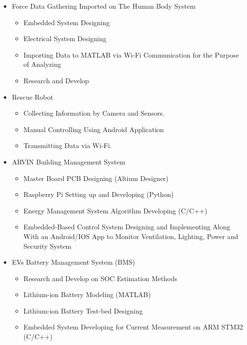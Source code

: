 \documentclass[10pt,a4paper,sans]{moderncv} %
\begin{document}
	\begin{itemize}[nosep]
		
		\item Force Data Gathering Imported on The Human Body System %
		\begin{itemize}[nosep]
			\item Embedded System Designing
			\item Electrical System Designing
			\item Importing Data to MATLAB via Wi-Fi Communication for the Purpose of Analyzing
			\item Research and Develop
		\end{itemize}
		
		\vspace{0.5em}
		
		\item Rescue Robot %
		\begin{itemize}[nosep]
		    \item Collecting Information by Camera and Sensors.
			\item Manual Controlling Using Android Application
			\item Transmitting Data via Wi-Fi. 
		\end{itemize}
		
		\vspace{0.5em}
		
		\item ARVIN Building Management System %
		\begin{itemize}[nosep]
			\item Master Board PCB Designing (Altium Designer)
			\item Raspberry Pi Setting up and Developing (Python)
			\item Energy Management System Algorithm Developing (C/C++) 
			\item Embedded-Based Control System Designing and Implementing Along With an Android/IOS App to Monitor Ventilation, Lighting, Power and Security System
		\end{itemize}
		
		\vspace{0.5em}
		
		\item EVs Battery Management System (BMS) %
		\begin{itemize}[nosep]
			\item Research and Develop on SOC Estimation Methods 
			\item Lithium-ion Battery Modeling (MATLAB)
			\item Lithium-ion Battery Test-bed Designing
			\item Embedded System Developing for Current Measurement on ARM STM32 (C/C++)
		\end{itemize}
		

\end{itemize}
\end{document}
